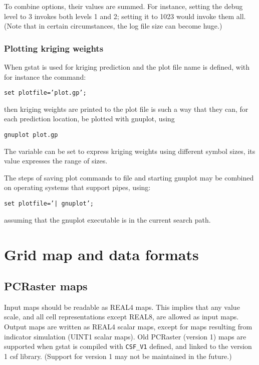 \documentclass[a4paper,12pt]{book}
\newcommand{\code}[1]{\texttt{#1}}
\newcommand{\iskey}[1]{\htmlref{\code{{#1}}}{key:#1}}
\begin{document}
To combine options, their values are summed. For instance, setting the
debug level to 3 invokes both levels 1 and 2; setting it to 1023 would
invoke them all. (Note that in certain circumstances, the log file size
can become huge.)

\subsection*{Plotting kriging weights}

When gstat is used for kriging prediction and the plot file name is
defined, with for instance the command:

{\tt set plotfile='plot.gp';}

\noindent
then kriging weights are printed to the plot file is such a way that
they can, for each prediction location, be plotted with gnuplot, using

{\tt gnuplot plot.gp }

The variable \iskey{plotweights} can be set to express kriging weights
using different symbol sizes, its value expresses the range of sizes.

The steps of saving plot commands to file and starting gnuplot may be 
combined on operating systems that support pipes, using:

{\tt set plotfile='| gnuplot';}

assuming that the gnuplot executable is in the current search path.

\chapter{Grid map and data formats}
\label{app:formats}

\section{PCRaster maps}
Input
 maps
should be readable as REAL4 maps. This implies that any value scale,
and all cell representations except REAL8, are allowed as input maps.
Output maps are written as REAL4 scalar maps, except for maps resulting
from indicator simulation (UINT1 scalar maps). Old PCRaster (version 1)
maps are supported when gstat is compiled with \verb|CSF_V1| defined,
and linked to the version 1 csf library. (Support for version 1 may not
be maintained in the future.)
\end{document}
